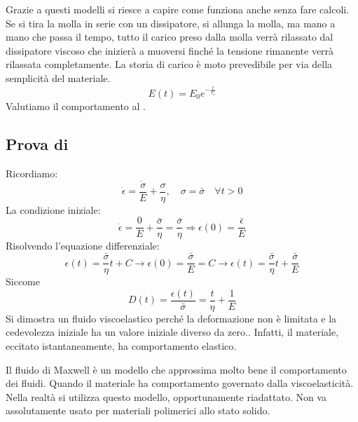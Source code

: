 Grazie a questi modelli si riesce a capire come funziona anche senza fare calcoli.
Se si tira la molla in serie con un dissipatore, si allunga la molla, ma mano a mano che passa il tempo, tutto il carico preso dalla molla verrà rilassato dal dissipatore viscoso che inizierà a muoversi finché la tensione rimanente verrà rilassata completamente.
La storia di carico è moto prevedibile per via della semplicità del materiale.
\begin{equation}
E(t) = E_0 e^{-\frac{t}{\tau_r}}
\end{equation}
Valutiamo il comportamento al .
\subsection{Prova di }
Ricordiamo:
\begin{equation}
\dot{\epsilon} = \frac{\dot{\sigma}}{E} + \frac{\sigma}{\eta}, \quad \sigma = \bar{\sigma} \quad \forall t > 0
\end{equation}
La condizione iniziale:
\begin{equation}
\dot{\epsilon} = \frac{0}{E} + \frac{\bar{\sigma}}{\eta} = \frac{\bar{\sigma}}{\eta} \Rightarrow \epsilon(0)=\frac{\bar{\epsilon}}{E}
\end{equation}
Risolvendo l'equazione differenziale:
\begin{equation}
\epsilon(t) = \frac{\bar{\sigma}}{\eta}t + C \rightarrow \epsilon(0) = \frac{\bar{\sigma}}{E} = C \rightarrow \epsilon(t) = \frac{\bar{\sigma}}{\eta}t + \frac{\bar{\sigma}}{E}
\end{equation}
Siccome
\begin{equation}
D(t) = \frac{\epsilon(t)}{\bar{\sigma}} = \frac{t}{\eta} + \frac{1}{E}
\end{equation}
Si dimostra un fluido viscoelastico perché la deformazione non è limitata e la cedevolezza iniziale ha un valore iniziale diverso da zero..
Infatti, il materiale, eccitato istantaneamente, ha comportamento elastico.

Il fluido di Maxwell è un modello che approssima molto bene il comportamento dei fluidi. Quando il materiale ha comportamento governato dalla viscoelasticità.
Nella realtà si utilizza questo modello, opportunamente riadattato.
Non va assolutamente usato per materiali polimerici allo stato solido.

